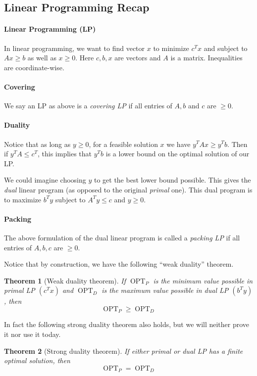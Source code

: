 \documentclass[11pt]{article}
\newtheorem{theorem}{Theorem}
\DeclareMathOperator{\opt}{OPT}
\begin{document}
\subsection{Linear Programming Recap}
\paragraph{Linear Programming (LP)} In linear programming, we want to find vector $x$ to minimize $c^Tx$ and subject to $Ax\geq b$ as well as $x\geq 0$. Here $c,b,x$ are vectors and $A$ is a matrix. Inequalities are coordinate-wise.
\paragraph{Covering} We say an LP as above is a {\em covering LP} if all entries of $A, b$ and $c$ are $\geq 0$.
\paragraph{Duality}
Notice that as long as $y\ge 0$, for a feasible solution $x$ we have $y^T Ax \ge y^T b$. Then if $y^T A \le c^T$, this implies that $y^T b$ is a lower bound on the optimal solution of our LP.

We could imagine choosing $y$ to get the best lower bound possible. This gives the {\em dual} linear program (as opposed to the original {\em primal} one). This dual program is to maximize $b^T y$ subject to $A^T y \le c$ and $y\ge 0$.

\paragraph{Packing} The above formulation of the dual linear program is called a {\em packing LP} if all entries of $A, b, c$ are $\geq 0$.

Notice that by construction, we have the following ``weak duality'' theorem.

\begin{theorem}[Weak duality theorem]
If $\opt_P$ is the minimum value possible in primal LP $(c^Tx)$ and
   $\opt_D$ is the maximum value possible in dual LP $(b^Ty)$, then
\[\opt_P \geq \opt_D\]
\end{theorem}

In fact the following strong duality theorem also holds, but we will neither prove it nor use it today.

\begin{theorem}[Strong duality theorem]
If either primal or dual LP has a finite optimal solution, then
\[\opt_P = \opt_D\]
\end{theorem}
\end{document}
